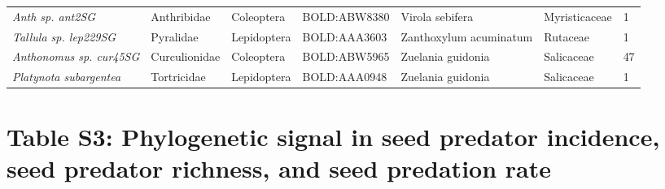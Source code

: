 \documentclass[11pt]{article}
\begin{document}
\begin{landscape}
\begin{longtable}{@{}lllllll@{}}
\textit{Anth sp. ant2SG}                              & Anthribidae     & Coleoptera   & BOLD:ABW8380 & Virola sebifera                    & Myristicaceae    & 1     \\
\textit{Tallula sp. lep229SG}                         & Pyralidae       & Lepidoptera  & BOLD:AAA3603 & Zanthoxylum acuminatum             & Rutaceae         & 1     \\
\textit{Anthonomus sp. cur45SG}                       & Curculionidae   & Coleoptera   & BOLD:ABW5965 & Zuelania guidonia                  & Salicaceae       & 47    \\
\textit{Platynota subargentea}                        & Tortricidae     & Lepidoptera  & BOLD:AAA0948 & Zuelania guidonia                  & Salicaceae       & 1     \\* 
\bottomrule
\end{longtable}
\end{landscape}



\newpage


\section{Table S3: Phylogenetic signal in seed predator incidence, seed predator richness, and seed predation rate}
\end{document}
